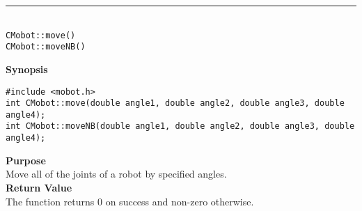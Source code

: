 \noindent
\vspace{5pt}
\rule{4.5in}{0.015in}\\
\noindent
{\LARGE \texttt{CMobot::move()}}\\
{\LARGE \texttt{CMobot::moveNB()}}\\
{}

\noindent
{\bf Synopsis}
\vspace{-8pt}
\begin{verbatim}
#include <mobot.h>
int CMobot::move(double angle1, double angle2, double angle3, double angle4);
int CMobot::moveNB(double angle1, double angle2, double angle3, double angle4);
\end{verbatim}

\noindent
{\bf Purpose}\\
Move all of the joints of a robot by specified angles.\\

\noindent
{\bf Return Value}\\
The function returns 0 on success and non-zero otherwise.\\

